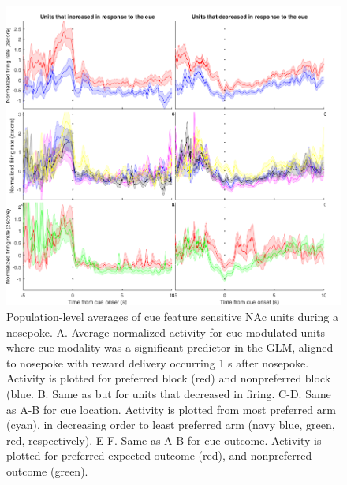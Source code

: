 \documentclass[11pt]{article}
\begin{document}
\begin{figure}[h]
\centering
\includegraphics[width=\textwidth]{Fig 10 - NP population averages.png}
\caption{Population-level averages of cue feature sensitive NAc units during a nosepoke. A. Average normalized activity for cue-modulated units where cue modality was a significant predictor in the GLM, aligned to nosepoke with reward delivery occurring 1 s after nosepoke. Activity is plotted for preferred block (red) and nonpreferred block (blue. B. Same as but for units that decreased in firing. C-D. Same as A-B for cue location. Activity is plotted from most preferred arm (cyan), in decreasing order to least preferred arm (navy blue, green, red, respectively). E-F. Same as A-B for cue outcome. Activity is plotted for preferred expected outcome (red), and nonpreferred outcome (green).}
\label{fig:NP_pop}
\end{figure}
\end{document}
